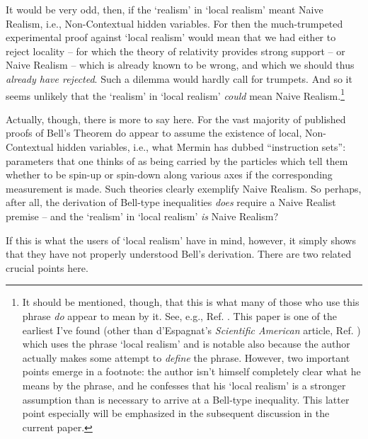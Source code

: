 \documentclass[12pt]{article}
\begin{document}
It would be very odd, then, if the `realism' in `local realism'
meant Naive Realism, i.e., Non-Contextual hidden variables.  For then
the much-trumpeted experimental proof against `local realism' would
mean that we had either to reject locality -- for which the theory of 
relativity provides strong support -- or Naive Realism -- which is already
known to be wrong, and which we should thus \emph{already have
  rejected}.  Such a dilemma would hardly call for trumpets.
And so it seems unlikely that the `realism' in `local realism'
\emph{could} mean Naive Realism.\footnote{It should be 
mentioned, though, that this is what many of
  those who use this phrase \emph{do} appear to mean by it.  See,
  e.g., Ref. \cite{mermin1980}.  This paper is one
  of the earliest I've found (other than d'Espagnat's \emph{Scientific 
  American} article, Ref. \cite{despagnat}) which
  uses the phrase `local realism' and is notable also because the
  author actually makes some attempt to \emph{define} the phrase.
  However, two important points emerge in a footnote:  the author
  isn't himself completely clear what he means by the phrase, and 
  he confesses that his 
  `local realism' is a stronger assumption than is
  necessary to arrive at a Bell-type inequality.  This latter point
  especially will be emphasized in the subsequent discussion in the
  current paper.}

Actually, though, there is more to say here.  For the vast majority of
published proofs of Bell's Theorem do appear to assume the existence
of local, Non-Contextual hidden variables, i.e., what Mermin has
dubbed ``instruction sets'':  parameters that one thinks of as being
carried by the particles which tell them whether to be spin-up or
spin-down along various axes if the corresponding measurement is
made. \cite{nrbellproofs}   Such theories clearly exemplify Naive
Realism.  So perhaps,
after all, the derivation of Bell-type inequalities \emph{does}
require a Naive Realist premise -- and the `realism' in `local
realism' \emph{is} Naive Realism?

If this is what the users of `local realism' have in mind, however,
it simply shows that they have not properly understood Bell's
derivation.  There are two related crucial points here.
\end{document}
